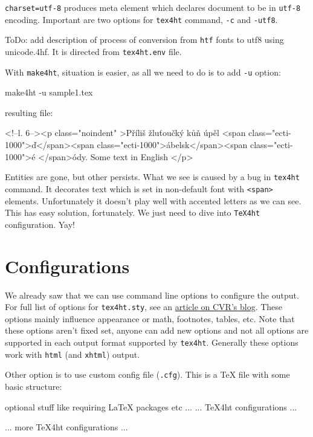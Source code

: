 \texttt{charset=utf-8} produces meta element which declares document to
be in \texttt{utf-8} encoding. Important are two options for
\texttt{tex4ht} command, \texttt{-c} and \texttt{-utf8}.

ToDo: add description of process of conversion from \texttt{htf} fonts
to utf8 using unicode.4hf. It is directed from \texttt{tex4ht.env} file.

With \texttt{make4ht}, situation is easier, as all we need to do is to
add \texttt{-u} option:

\begin{shellcommand}
make4ht -u sample1.tex
\end{shellcommand}

resulting file:

\begin{htmlsource}
<!--l. 6--><p class="noindent" >Příliš žluťoučký kůň úpěl <span 
class="ecti-1000">ď</span><span 
class="ecti-1000">ábelsk</span><span 
class="ecti-1000">é </span>ódy. Some text in English
</p> 
\end{htmlsource}

Entities are gone, but other persists. What we see is caused by a bug in
\texttt{tex4ht} command. It decorates text which is set in non-default
font with \texttt{\textless{}span\textgreater{}} elements. Unfortunately
it doesn't play well with accented letters as we can see. This has easy
solution, fortunately. We just need to dive into \texttt{TeX4ht}
configuration. Yay!

\hypertarget{configurations}{%
\section{Configurations}\label{configurations}}

We already saw that we can use command line options to configure the
output. For full list of options for \texttt{tex4ht.sty}, see an
\href{http://www.cvr.cc/?p=504}{article on CVR's blog}. These options
mainly influence appearance or math, footnotes, tables, etc. Note that
these options aren't fixed set, anyone can add new options and not all
options are supported in each output format supported by
\texttt{tex4ht}. Generally these options work with \texttt{html} (and
\texttt{xhtml}) output.

Other option is to use custom config file (\texttt{.cfg}). This is a TeX
file with some basic structure:

\begin{texsource}
 optional stuff like requiring LaTeX packages etc
 ...
 ...
 TeX4ht configurations
 ...
  
 ...
 more TeX4ht configurations
 ...
 \EndPreamble
\end{texsource}

